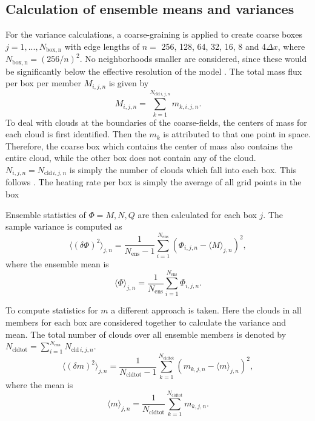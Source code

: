 \documentclass[a4paper, 12pt]{article}
\begin{document}
\subsection{Calculation of ensemble means and variances}
For the variance calculations, a coarse-graining is applied to create coarse boxes $j=1,...,N_{\mathrm{box,n}}$ with edge lengths of $n=$ 256, 128, 64, 32, 16, 8 and 4$\Delta x$, where $N_{\mathrm{box,n}}=(256/n)^2$. No neighborhoods smaller are considered, since these would be significantly below the effective resolution of the model \citep{Skamarock2004}. The total mass flux per box per member $M_{i,j,n}$ is given by
\begin{equation} \label{eq:calc_memM}
 M_{i,j,n} = \sum_{k=1}^{N_{\mathrm{cld}\,i,j,n}} m_{k,i,j,n}.
\end{equation}
To deal with clouds at the boundaries of the coarse-fields, the centers of mass for each cloud is first identified. Then the $m_k$ is attributed to that one point in space. Therefore, the coarse box which contains the center of mass also contains the entire cloud, while the other box does not contain any of the cloud. $N_{i,j,n}=N_{\mathrm{cld}\,i,j,n}$ is simply the number of clouds which fall into each box. This follows \cite{Cohen2006}. The heating rate per box is simply the average of all grid points in the box

Ensemble statistics of $\Phi = M, N, Q$ are then calculated for each box $j$. The sample variance is computed as
\begin{equation} \label{eq:calc_varM}
 \langle (\delta \Phi )^2 \rangle_{j,n} = \frac{1}{N_{\mathrm{ens}}-1} \sum_{i=1}^{N_{\mathrm{ens}}} (\Phi_{i,j,n} - \langle M \rangle_{j,n})^2,
\end{equation}
where the ensemble mean is
\begin{equation} \label{eq:calc_meanM}
 \langle \Phi \rangle_{j,n} = \frac{1}{N_{\mathrm{ens}}} \sum_{i=1}^{N_{\mathrm{ens}}} \Phi_{i,j,n}.
\end{equation}

To compute statistics for $m$ a different approach is taken. Here the clouds in all members for each box are considered together to calculate the variance and mean. The total number of clouds over all ensemble members is denoted by $N_{\mathrm{cldtot}} = \sum_{i=1}^{N_{\mathrm{ens}}} N_{\mathrm{cld}\,i,j,n}$.
\begin{equation} \label{eq:calc_varm}
 \langle (\delta m )^2 \rangle_{j,n} = \frac{1}{N_{\mathrm{cldtot}}-1} \sum_{k=1}^{N_{\mathrm{cldtot}}} (m_{k,j,n} - \langle m \rangle_{j,n})^2,
\end{equation}
where the mean is
\begin{equation} \label{eq:calc_meanm}
 \langle m \rangle_{j,n} = \frac{1}{N_{\mathrm{cldtot}}} \sum_{k=1}^{N_{\mathrm{cldtot}}} m_{k,j,n}.
\end{equation}
\end{document}
